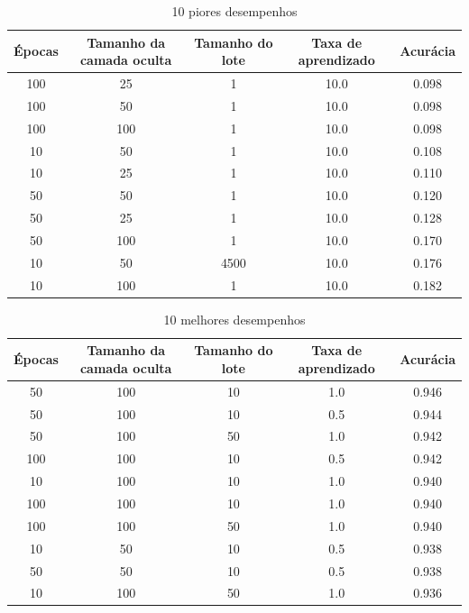 \documentclass{article}
\begin{document}
\begin{table}[H]
    \centering
        \captionsetup{labelformat=empty} 
        \caption{10 piores desempenhos}
        \begin{tabular}{| c c c c c |}
        \hline
        Épocas & Tamanho da camada oculta & Tamanho do lote & Taxa de aprendizado & Acurácia \\
        \hline
            100 &  25 &    1 & 10.0 & 0.098 \\
            100 &  50 &    1 & 10.0 & 0.098 \\
            100 & 100 &    1 & 10.0 & 0.098 \\
            10 &  50 &    1 & 10.0 & 0.108 \\
            10 &  25 &    1 & 10.0 & 0.110 \\
            50 &  50 &    1 & 10.0 & 0.120 \\
            50 &  25 &    1 & 10.0 & 0.128 \\
            50 & 100 &    1 & 10.0 & 0.170 \\
            10 &  50 & 4500 & 10.0 & 0.176 \\
            10 & 100 &    1 & 10.0 & 0.182 \\
        \hline
        \end{tabular}
\end{table}

\begin{table}[H]
    \centering
        \captionsetup{labelformat=empty} 
        \caption{10 melhores desempenhos}
        \begin{tabular}{| c c c c c |}
        \hline
        Épocas & Tamanho da camada oculta & Tamanho do lote & Taxa de aprendizado & Acurácia \\
        \hline
            50 & 100 & 10 & 1.0 & 0.946 \\
            50 & 100 & 10 & 0.5 & 0.944 \\
            50 & 100 & 50 & 1.0 & 0.942 \\
            100 & 100 & 10 & 0.5 & 0.942 \\
            10 & 100 & 10 & 1.0 & 0.940 \\
            100 & 100 & 10 & 1.0 & 0.940 \\
            100 & 100 & 50 & 1.0 & 0.940 \\
            10 &  50 & 10 & 0.5 & 0.938 \\
            50 &  50 & 10 & 0.5 & 0.938 \\
            10 & 100 & 50 & 1.0 & 0.936 \\
        \hline
        \end{tabular}
\end{table}
\end{document}
